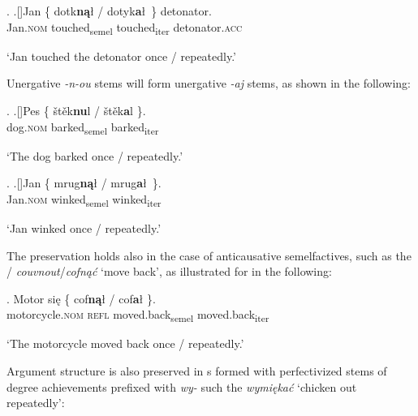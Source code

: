 \ex.\label{pres2} \label{dotykal}
\ag.[]\hspace{-22pt}Jan \{ dotk\textbf{n\k{a}}\l {} {/} {dotyk\textbf{a}\l \ \}} detonator.\\
\hspace{-22pt}Jan.\textsc{nom} {}  touched\textsubscript{semel} {}  touched\textsubscript{iter}  detonator.\textsc{acc}\\ 
\hspace{-22pt}\strut `Jan touched the detonator once / repeatedly.'

Unergative  \textit{-n-ou} stems will form unergative \textit{-aj} stems, as shown in the following:

\ex. 
\ag.[]\hspace{-22pt}Pes \{ \v{s}t\v{e}k\textbf{nu}l  {/} {\v{s}t\v{e}k\textbf{a}l \}}.\\
\hspace{-22pt}dog.\textsc{nom} {} barked\textsubscript{semel} {} {barked\textsubscript{iter}}\\
\hspace{-22pt}\strut `The dog barked once / repeatedly.'


\ex. 
\ag.[]\hspace{-22pt}Jan \{ mrug\textbf{n\k{a}}\l {} {/} {mrug\textbf{a}\l \ \}}.\\
\hspace{-22pt}Jan.\textsc{nom} {} winked\textsubscript{semel} {} {winked\textsubscript{iter}}\\
\hspace{-22pt}\strut `Jan winked once / repeatedly.'

The  preservation holds also in the case of anticausative semelfactives, such as the /  \textit{couvnout}/\textit{cofn\k{a}\'c} `move back', as illustrated for  in the following:

\exg.
Motor si\k{e} \{ cof\textbf{n\k{a}}\l {}  {/} {cof\textbf{a}\l {} \}}.\\
motorcycle.\textsc{nom} \textsc{refl} {} moved.back\textsubscript{semel} {}  {moved.back\textsubscript{iter}}\\ 
\strut `The motorcycle moved back once / repeatedly.'

\noindent
Argument structure is also preserved in s formed with perfectivized stems of degree achievements prefixed with \textit{wy-} such the  \textit{wymi\k{e}ka\'c} `chicken out repeatedly':

